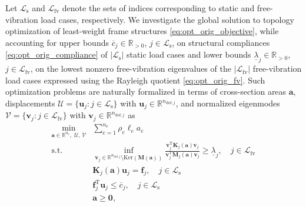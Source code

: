 \documentclass[final,onefignum,onetabnum]{siamart220329}
\begin{document}
{Let $\mathcal{L}_\mathrm{s}$ and $\mathcal{L}_\mathrm{fv}$ denote the sets of indices corresponding to static and free-vibration load cases, respectively.} We investigate the global solution to topology optimization of least-weight frame structures \eqref{eq:opt_orig_objective}, while accounting for upper bounds $\overline{c}_j \in \mathbb{R}_{>0}$, $j \in {\mathcal{L}_\mathrm{s}}$, on structural compliances \eqref{eq:opt_orig_compliance} of {$\lvert \mathcal{L}_\mathrm{s} \rvert$ static} load cases and lower bounds $\underline{\lambda}_j \in \mathbb{R}_{>0}${, $j \in \mathcal{L}_\mathrm{fv}$,} on the lowest nonzero free-vibration eigenvalues {of the $\lvert \mathcal{L}_\mathrm{fv} \rvert$ free-vibration load cases} expressed using the Rayleigh quotient \eqref{eq:opt_orig_fv}. Such optimization problems are naturally formalized in terms of cross-section areas $\mathbf{a}$, displacements $\mathcal{U} = {\{\mathbf{u}_j : j \in \mathcal{L}_\mathrm{s}\}}$ with $\mathbf{u}_j \in \mathbb{R}^{n_{\mathrm{dof},j}}$, and normalized eigenmodes $\mathcal{V} = {\{\mathbf{v}_j : j \in \mathcal{L}_\mathrm{fv}\}}$ with $\mathbf{v}_j \in \mathbb{R}^{n_{\mathrm{dof},j}}$ as
%
\begin{subequations}\label{eq:opt_orig}
	\begin{align}
		\min_{\mathbf{a}\in \mathbb{R}^{n_{\mathrm{e}}}\!,\;
        \mathcal{U},\, 
        \mathcal{V}} 
        & \sum_{e=1}^{n_\mathrm{e} } \rho_e \ell_e a_e\label{eq:opt_orig_objective}\\
		\text{s.t.}\; & \inf_{\mathbf{v}_j \in \mathbb{R}^{n_{\mathrm{dof},j}} \setminus \mathrm{Ker}\left( \mathbf{M}(\mathbf{a}) \right)} \frac{\mathbf{v}_j^\mathrm{T} \mathbf{K}_j(\mathbf{a}) \mathbf{v}_j}{\mathbf{v}_j^\mathrm{T} \mathbf{M}_j(\mathbf{a}) \mathbf{v}_j} \ge \underline{\lambda}_j,\quad j \in {\mathcal{L}_\mathrm{fv}}\label{eq:opt_orig_fv}\\
		& \mathbf{K}_j(\mathbf{a}) \mathbf{u}_j = \mathbf{f}_j,\quad j \in {\mathcal{L}_\mathrm{s}}\label{eq:opt_orig_static}\\
		& \mathbf{f}_j^\mathrm{T} \mathbf{u}_j \le \overline{c}_j,\quad j \in {\mathcal{L}_\mathrm{s}}\label{eq:opt_orig_compliance}\\
		& \mathbf{a} \ge \mathbf{0},\label{eq:opt_orig_nonneg}
	\end{align}
\end{subequations}
%
\end{document}
